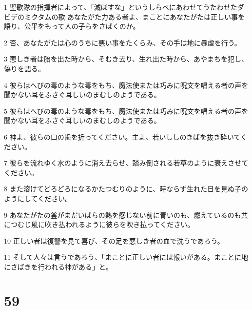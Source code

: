 \par 1 聖歌隊の指揮者によって、「滅ぼすな」というしらべにあわせてうたわせたダビデのミクタムの歌 あなたがた力ある者よ、まことにあなたがたは正しい事を語り、公平をもって人の子らをさばくのか。
\par 2 否、あなたがたは心のうちに悪い事をたくらみ、その手は地に暴虐を行う。
\par 3 悪しき者は胎を出た時から、そむき去り、生れ出た時から、あやまちを犯し、偽りを語る。
\par 4 彼らはへびの毒のような毒をもち、魔法使または巧みに呪文を唱える者の声を聞かない耳をふさぐ耳しいのまむしのようである。
\par 5 彼らはへびの毒のような毒をもち、魔法使または巧みに呪文を唱える者の声を聞かない耳をふさぐ耳しいのまむしのようである。
\par 6 神よ、彼らの口の歯を折ってください。主よ、若いししのきばを抜き砕いてください。
\par 7 彼らを流れゆく水のように消え去らせ、踏み倒される若草のように衰えさせてください。
\par 8 また溶けてどろどろになるかたつむりのように、時ならず生れた日を見ぬ子のようにしてください。
\par 9 あなたがたの釜がまだいばらの熱を感じない前に青いのも、燃えているのも共につむじ風に吹き払われるように彼らを吹き払ってください。
\par 10 正しい者は復讐を見て喜び、その足を悪しき者の血で洗うであろう。
\par 11 そして人々は言うであろう、「まことに正しい者には報いがある。まことに地にさばきを行われる神がある」と。

\chapter{59}

